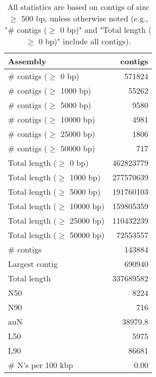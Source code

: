 \documentclass[12pt,a4paper]{article}
\begin{document}
\begin{table}[ht]
\begin{center}
\caption{All statistics are based on contigs of size $\geq$ 500 bp, unless otherwise noted (e.g., "\# contigs ($\geq$ 0 bp)" and "Total length ($\geq$ 0 bp)" include all contigs).}
\begin{tabular}{|l*{1}{|r}|}
\hline
Assembly & contigs \\ \hline
\# contigs ($\geq$ 0 bp) & 571824 \\ \hline
\# contigs ($\geq$ 1000 bp) & 55262 \\ \hline
\# contigs ($\geq$ 5000 bp) & 9580 \\ \hline
\# contigs ($\geq$ 10000 bp) & 4981 \\ \hline
\# contigs ($\geq$ 25000 bp) & 1806 \\ \hline
\# contigs ($\geq$ 50000 bp) & 717 \\ \hline
Total length ($\geq$ 0 bp) & 462823779 \\ \hline
Total length ($\geq$ 1000 bp) & 277570639 \\ \hline
Total length ($\geq$ 5000 bp) & 191760103 \\ \hline
Total length ($\geq$ 10000 bp) & 159805359 \\ \hline
Total length ($\geq$ 25000 bp) & 110432239 \\ \hline
Total length ($\geq$ 50000 bp) & 72553557 \\ \hline
\# contigs & 143884 \\ \hline
Largest contig & 690940 \\ \hline
Total length & 337689582 \\ \hline
N50 & 8224 \\ \hline
N90 & 716 \\ \hline
auN & 38979.8 \\ \hline
L50 & 5975 \\ \hline
L90 & 86681 \\ \hline
\# N's per 100 kbp & 0.00 \\ \hline
\end{tabular}
\end{center}
\end{table}
\end{document}
